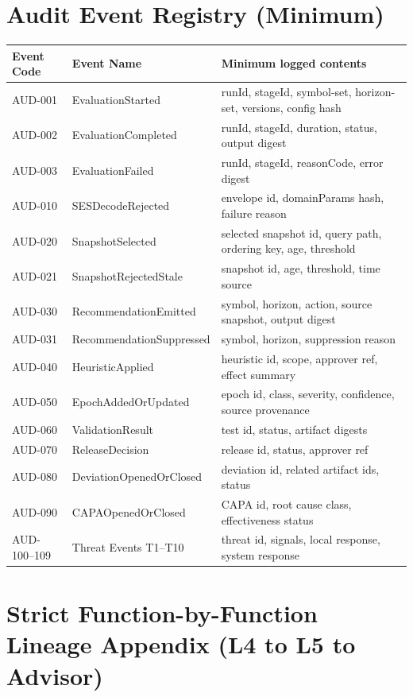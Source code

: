 \documentclass[11pt]{report}
\begin{document}
\chapter{Audit Event Registry (Minimum)}
\begin{longtable}{p{}p{}p{}}
\toprule
Event Code & Event Name & Minimum logged contents \\
\midrule
AUD-001 & EvaluationStarted & runId, stageId, symbol-set, horizon-set, versions, config hash \\
AUD-002 & EvaluationCompleted & runId, stageId, duration, status, output digest \\
AUD-003 & EvaluationFailed & runId, stageId, reasonCode, error digest \\
AUD-010 & SESDecodeRejected & envelope id, domainParams hash, failure reason \\
AUD-020 & SnapshotSelected & selected snapshot id, query path, ordering key, age, threshold \\
AUD-021 & SnapshotRejectedStale & snapshot id, age, threshold, time source \\
AUD-030 & RecommendationEmitted & symbol, horizon, action, source snapshot, output digest \\
AUD-031 & RecommendationSuppressed & symbol, horizon, suppression reason \\
AUD-040 & HeuristicApplied & heuristic id, scope, approver ref, effect summary \\
AUD-050 & EpochAddedOrUpdated & epoch id, class, severity, confidence, source provenance \\
AUD-060 & ValidationResult & test id, status, artifact digests \\
AUD-070 & ReleaseDecision & release id, status, approver ref \\
AUD-080 & DeviationOpenedOrClosed & deviation id, related artifact ids, status \\
AUD-090 & CAPAOpenedOrClosed & CAPA id, root cause class, effectiveness status \\
AUD-100--109 & Threat Events T1--T10 & threat id, signals, local response, system response \\
\bottomrule
\end{longtable}


\chapter{Strict Function-by-Function Lineage Appendix (L4 to L5 to Advisor)}
\end{document}
